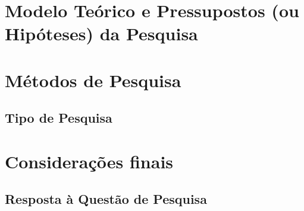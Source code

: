 \chapter{Modelo Teórico e Pressupostos (ou Hipóteses) da Pesquisa}


\chapter{Métodos de Pesquisa}

\section{Tipo de Pesquisa}

\chapter{Considerações finais}

\section{Resposta à Questão de Pesquisa}
